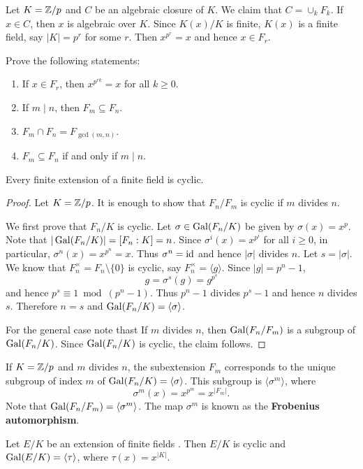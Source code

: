 Let $K=\mathbb{Z}/p$ and $C$ be an algebraic closure of $K$. 
We claim that $C=\cup_k F_k$. If $x\in C$, then $x$ is algebraic over $K$. 
Since $K(x)/K$ is finite, $K(x)$ is a finite field, say 
$|K|=p^r$ for some $r$. Then $x^{p^r}=x$ and hence $x\in F_r$. 

\begin{exercise}
    Prove the following statements:
    \begin{enumerate}
        \item If $x\in F_r$, then $x^{p^{rk}}=x$ for all $k\geq0$.
        \item If $m\mid n$, then $F_m\subseteq F_n$. 
        \item $F_m\cap F_n=F_{\gcd(m,n)}$.
        \item $F_m\subseteq F_n$ if and only if $m\mid n$. 
    \end{enumerate}
\end{exercise}

\begin{proposition}
    Every finite extension of a finite field is cyclic. 
\end{proposition}

\begin{proof}
    Let $K=\mathbb{Z}/p$. It is enough to show that $F_n/F_m$ is cyclic if $m$ divides $n$. 
    
    We first prove that $F_n/K$ is cyclic. Let $\sigma\in\operatorname{Gal}(F_n/K)$ be given by $\sigma(x)=x^p$. 
    Note that $|\operatorname{Gal}(F_n/K)|=[F_n:K]=n$. Since 
    $\sigma^i(x)=x^{p^i}$ for all $i\geq 0$, in particular, 
    $\sigma^n(x)=x^{p^n}=x$. Thus $\sigma^n=\operatorname{id}$ and hence $|\sigma|$ divides $n$. Let 
    $s=|\sigma|$. We know that $F_n^{\times}=F_n\setminus\{0\}$ is
    cyclic, say $F_n^{\times}=\langle g\rangle$. Since $|g|=p^n-1$, 
    \[
    g=\sigma^s(g)=g^{p^s}
    \]
    and hence $p^s\equiv 1\bmod (p^n-1)$. Thus $p^n-1$ divides $p^s-1$ and
    hence $n$ divides $s$. Therefore $n=s$ and $\operatorname{Gal}(F_n/K)=\langle\sigma\rangle$. 
    
    For the general case note thast If $m$ divides $n$, 
    then $\operatorname{Gal}(F_n/F_m)$ is a subgroup of $\operatorname{Gal}(F_n/K)$. Since  $\operatorname{Gal}(F_n/K)$ is cyclic, 
    the claim follows.
\end{proof}

If $K=\mathbb{Z}/p$ and 
$m$ divides $n$, the subextension $F_m$ corresponds 
to the unique
subgroup of index $m$ of $\operatorname{Gal}(F_n/K)=\langle\sigma\rangle$. This subgroup
is $\langle\sigma^m\rangle$, where
\[
\sigma^m(x)=x^{p^m}=x^{|F_m|}.
\]
Note that $\operatorname{Gal}(F_n/F_m)=\langle\sigma^m\rangle$. 
The map $\sigma^m$ is known as 
the \textbf{Frobenius automorphism}. 

\begin{exercise}
    Let $E/K$ be an extension of finite fields . Then $E/K$ 
    is cyclic and $\operatorname{Gal}(E/K)=\langle\tau\rangle$, where $\tau(x)=x^{|K|}$. 
\end{exercise}



